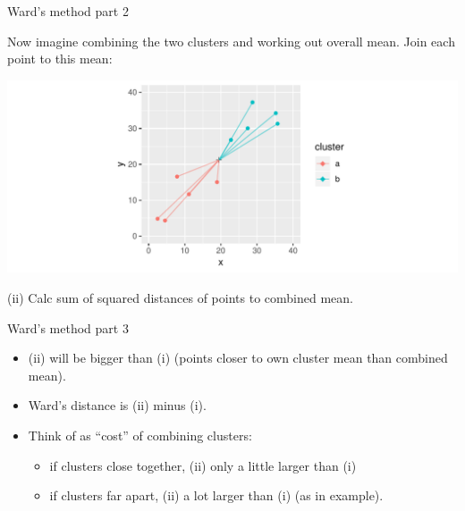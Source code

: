 \documentclass[unknownkeysallowed]{beamer}\usepackage[]{graphicx}\usepackage[]{color}
\makeatletter
\def\maxwidth{ %
  \ifdim\Gin@nat@width>\linewidth
    \linewidth
  \else
    \Gin@nat@width
  \fi
}
\newenvironment{knitrout}{}{} %
\makeatother
\begin{document}
\begin{frame}[fragile]{Ward's method part 2}
  
Now imagine combining the two clusters and working out overall
mean. Join each point to this mean:

\begin{knitrout}
\color{fgcolor}
\includegraphics[width=\maxwidth]{figure/unnamed-chunk-321-1} 

\end{knitrout}
(ii) Calc sum of squared distances of points to combined mean.
  
\end{frame}

\begin{frame}[fragile]{Ward's method part 3}
  
  \begin{itemize}
  \item (ii) will be bigger than (i) (points closer to own cluster
    mean than combined mean).
  \item Ward's distance is (ii) minus (i).
  \item Think of as ``cost'' of combining clusters:
    \begin{itemize}
    \item if clusters close together, (ii) only a little larger than
      (i)
    \item if clusters far apart, (ii) a lot larger than (i) (as in
      example). 
    \end{itemize}
  \end{itemize}
  
\end{frame}
\end{document}
